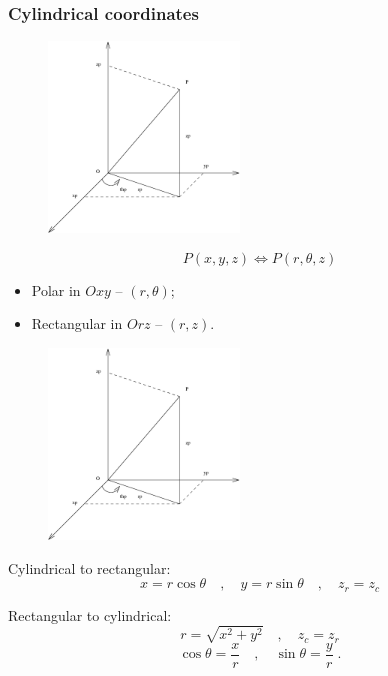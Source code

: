 \begin{frame}
 \frametitle{Cylindrical coordinates}
%
\begin{figure}[h]
  \includegraphics[height=2in]{../../modules/coordinate-systems/pictures/cylindrical_coordinates.eps}
\end{figure}
%
$$P(x,y,z) \Longleftrightarrow P(r, \theta, z)$$

\begin{itemize}
    \item Polar in $Oxy$ -- $(r, \theta)$;
    \item Rectangular in $Orz$ -- $(r, z)$.
\end{itemize}

\end{frame}

\begin{frame}
%
\begin{figure}[h]
  \includegraphics[height=2in]{../../modules/coordinate-systems/pictures/cylindrical_coordinates.eps}
\end{figure}
%
Cylindrical to rectangular:\pause
$$x=r\cos\theta \quad , \quad y = r\sin\theta \quad , \quad z_{r} = z_{c}$$

Rectangular to cylindrical:\pause
$$r= \sqrt{x^2+y^2} \quad , \quad z_{c}=z_{r}$$
$$\cos\theta = \frac{x}{r} \quad , \quad \sin\theta = \frac{y}{r}\; .$$
\end{frame}

